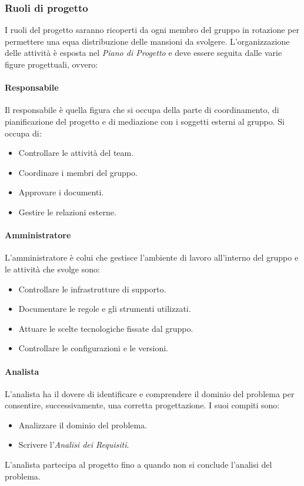 \subsubsection{Ruoli di progetto}
I ruoli del progetto saranno ricoperti da ogni membro del gruppo in rotazione per permettere
una equa distribuzione delle mansioni da svolgere. L'organizzazione delle attività
è esposta nel \emph{Piano di Progetto} e deve essere seguita dalle varie figure progettuali, ovvero:

\paragraph{Responsabile}
Il responsabile è quella figura che si occupa della parte di coordinamento, di pianificazione del progetto 
e di mediazione con i soggetti esterni al gruppo. Si occupa di:
\begin{itemize}
    \item Controllare le attività del team.
    \item Coordinare i membri del gruppo.
    \item Approvare i documenti.
    \item Gestire le relazioni esterne.
\end{itemize}

\paragraph{Amministratore}
L'amministratore è colui che gestisce l'ambiente di lavoro all'interno del gruppo e le attività che svolge sono:
\begin{itemize}
    \item Controllare le infrastrutture di supporto.
    \item Documentare le regole e gli strumenti utilizzati.
    \item Attuare le scelte tecnologiche fissate dal gruppo.
    \item Controllare le configurazioni e le versioni.
\end{itemize}

\paragraph{Analista}
L'analista ha il dovere di identificare e comprendere il dominio del problema per consentire, successivamente,
una corretta progettazione. I suoi compiti sono:
\begin{itemize}
    \item Analizzare il dominio del problema.
    \item Scrivere l'\emph{Analisi dei Requisiti}.
\end{itemize}
L'analista partecipa al progetto fino a quando non si conclude l'analisi del problema.

